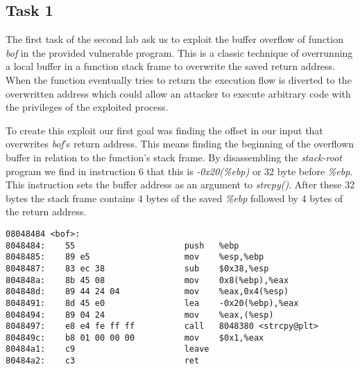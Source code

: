 



\subsection{Task 1}
The first task of the second lab ask us to exploit the buffer overflow of function \emph{bof} in the provided vulnerable program. This is a classic technique of overrunning a local buffer in a function stack frame to overwrite the saved return address. When the function eventually tries to return the execution flow is diverted to the overwritten address which could allow an attacker to execute arbitrary code with the privileges  of the exploited process.

To create this exploit our first goal was finding the offset in our input that overwrites \emph{bof}'s return address. This means finding the beginning of the overflown buffer in relation to the function's stack frame. By disassembling the \emph{stack-root} program we find in instruction 6 that this is \emph{-0x20(\%ebp)} or 32 byte before \emph{\%ebp}. This instruction sets the buffer address as an argument to \emph{strcpy()}. After these 32 bytes the stack frame contains 4 bytes of the saved \emph{\%ebp} followed by 4 bytes of the return address.

\begin{minipage}{\linewidth}
\begin{lstlisting}[caption={???},
frame=single]
08048484 <bof>:
8048484:	55                   	push   %ebp
8048485:	89 e5                	mov    %esp,%ebp
8048487:	83 ec 38             	sub    $0x38,%esp
804848a:	8b 45 08             	mov    0x8(%ebp),%eax
804848d:	89 44 24 04          	mov    %eax,0x4(%esp)
8048491:	8d 45 e0             	lea    -0x20(%ebp),%eax
8048494:	89 04 24             	mov    %eax,(%esp)
8048497:	e8 e4 fe ff ff       	call   8048380 <strcpy@plt>
804849c:	b8 01 00 00 00       	mov    $0x1,%eax
80484a1:	c9                   	leave
80484a2:	c3                   	ret
\end{lstlisting}
\end{minipage}

